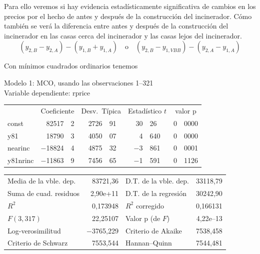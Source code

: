 Para ello veremos si hay evidencia estadísticamente significativa de cambios en los precios por el hecho de antes y después de la construcción del incinerador. Cómo también se verá la diferencia entre antes y después de la construcción del incinerador en las casas cerca del incinerador y las casas lejos del incinerador.
$$\left(y_{2,B}-y_{2,A}\right)-\left(y_{1,B}+y_{1,A}\right) \quad \text{o} \quad \left(y_{2,B}-y_{1,VBB}\right)-\left(y_{2,A}-y_{1,A}\right)$$

Con mínimos cuadrados ordinarios tenemos

\begin{center}

Modelo 1: MCO, usando las observaciones 1--321\\
Variable dependiente: rprice\\

\vspace{1em}

\begin{tabular}{lr@{,}lr@{,}lr@{,}lr@{,}l}
  &
 \multicolumn{2}{c}{Coeficiente} &
  \multicolumn{2}{c}{Desv.\ Típica} &
   \multicolumn{2}{c}{Estadístico $t$} &
    \multicolumn{2}{c}{valor p} \\[1ex]
const &
  82517&2 &
    2726&91 &
      30&26 &
        0&0000 \\
y81 &
  18790&3 &
    4050&07 &
      4&640 &
        0&0000 \\
nearinc &
  $-$18824&4 &
    4875&32 &
      $-$3&861 &
        0&0001 \\
y81nrinc &
  $-$11863&9 &
    7456&65 &
      $-$1&591 &
        0&1126 \\
\end{tabular}

\vspace{1ex}
\begin{tabular}{lrlr}
Media de la vble. dep. &  83721,36 & D.T. de la vble. dep. &  33118,79 \\
Suma de cuad. residuos &  2,90\textrm{e+11} & D.T. de la regresión &  30242,90 \\
$R^2$ &  0,173948 & $R^2$ corregido &  0,166131 \\
$F(3, 317)$ &  22,25107 & Valor p (de $F$) &  4,22\textrm{e--13} \\
Log-verosimilitud & $-$3765,229 & Criterio de Akaike &  7538,458 \\
Criterio de Schwarz &  7553,544 & Hannan--Quinn &  7544,481 \\
\end{tabular}


\end{center}

